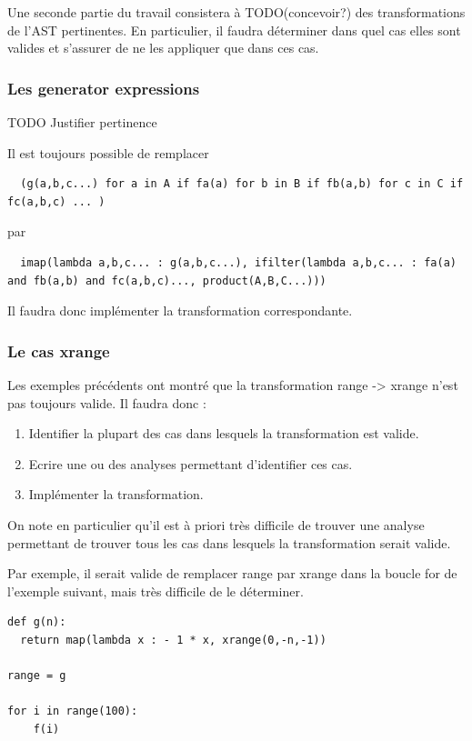 \documentclass[a4paper]{article}
\begin{document}
Une seconde partie du travail consistera à TODO(concevoir?) des transformations de l'AST pertinentes. En particulier, il faudra déterminer dans quel cas elles sont valides et s'assurer de ne les appliquer que dans ces cas.

\subsubsection{Les generator expressions}

TODO Justifier pertinence

Il est toujours possible de remplacer 

\begin{verbatim}
  (g(a,b,c...) for a in A if fa(a) for b in B if fb(a,b) for c in C if fc(a,b,c) ... )
\end{verbatim}
 
par

\begin{verbatim}
  imap(lambda a,b,c... : g(a,b,c...), ifilter(lambda a,b,c... : fa(a) and fb(a,b) and fc(a,b,c)..., product(A,B,C...)))
\end{verbatim}

Il faudra donc implémenter la transformation correspondante.

\subsubsection{Le cas xrange}

Les exemples précédents ont montré que la transformation range -> xrange n'est pas toujours valide. Il faudra donc :

\begin{enumerate}
  \item Identifier la plupart des cas dans lesquels la transformation est valide.
  \item Ecrire une ou des analyses permettant d'identifier ces cas.
  \item Implémenter la transformation.
\end{enumerate}

On note en particulier qu'il est à priori très difficile de trouver une analyse permettant de trouver tous les cas dans lesquels la transformation serait valide.

Par exemple, il serait valide de remplacer range par xrange dans la boucle for de l'exemple suivant, mais très difficile de le déterminer.


\begin{verbatim}
def g(n):
  return map(lambda x : - 1 * x, xrange(0,-n,-1))

range = g

for i in range(100):
    f(i)
\end{verbatim}


\clearpage

\appendix


\listoffigures            



\end{document}
